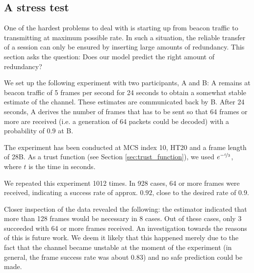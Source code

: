 \documentclass[10pt,a4paper]{article}
\begin{document}
\subsection{A stress test}
One of the hardest problems to deal with is starting up from beacon traffic to transmitting at maximum possible rate. 
In such a situation, the reliable transfer of a session can only be ensured by inserting large amounts of redundancy.
This section asks the question: Does our model predict the right amount of redundancy?

We set up the following experiment with two participants, A and B:
A remains at beacon traffic of 5 frames per second for 24 seconds to obtain a somewhat stable estimate of the channel.
These estimates are communicated back by B.
After 24 seconds, A derives the number of frames that has to be sent so that 64 frames or more are received (i.e. a generation of 64 packets could be decoded) with a probability of $0.9$ at B.

The experiment has been conducted at MCS index 10, HT20 and a frame length of 28B.
As a trust function (see Section \ref{sec:trust_function}), we used $e^{-\nicefrac{t}{3}}$, where $t$ is the time in seconds.

We repeated this experiment 1012 times.
In 928 cases, 64 or more frames were received, indicating a success rate of approx. $0.92$, close to the desired rate of $0.9$.

Closer inspection of the data revealed the following:
the estimator indicated that more than 128 frames would be necessary in 8 cases. 
Out of these cases, only 3 succeeded with 64 or more frames received.
An investigation towards the reasons of this is future work.
We deem it likely that this happened merely due to the fact that the channel became unstable at the moment of the experiment (in general, the frame success rate was about $0.83$) and no safe prediction could be made.
\end{document}
